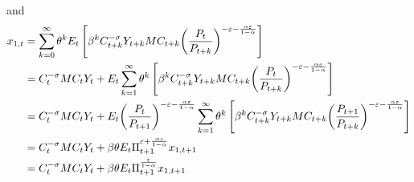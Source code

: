 \documentclass[12pt,a4paper]{article}
\begin{document}
and
\begin{align}
  {x_{1,t}} &= \sum\limits_{k = 0}^\infty  {{\theta ^k}{E_t}\left[ {{\beta ^k}C_{t + k}^{ - \sigma }{Y_{t + k}}M{C_{t + k}}{{\left( {\frac{{{P_t}}}{{{P_{t + k}}}}} \right)}^{ - \varepsilon  - \frac{{\alpha \varepsilon }}{{1 - \alpha }}}}} \right]}  \hfill \\
   &= C_t^{ - \sigma }M{C_t}{Y_t} + {E_t}\sum\limits_{k = 1}^\infty  {{\theta ^k}\left[ {{\beta ^k}C_{t + k}^{ - \sigma }{Y_{t + k}}M{C_{t + k}}{{\left( {\frac{{{P_t}}}{{{P_{t + k}}}}} \right)}^{ - \varepsilon  - \frac{{\alpha \varepsilon }}{{1 - \alpha }}}}} \right]}  \hfill \\
   &= C_t^{ - \sigma }M{C_t}{Y_t} + {E_t}{\left( {\frac{{{P_t}}}{{{P_{t + 1}}}}} \right)^{ - \varepsilon  - \frac{{\alpha \varepsilon }}{{1 - \alpha }}}}\sum\limits_{k = 1}^\infty  {{\theta ^k}\left[ {{\beta ^k}C_{t + k}^{ - \sigma }{Y_{t + k}}M{C_{t + k}}{{\left( {\frac{{{P_{t + 1}}}}{{{P_{t + k}}}}} \right)}^{ - \varepsilon  - \frac{{\alpha \varepsilon }}{{1 - \alpha }}}}} \right]}  \hfill \\
   &= C_t^{ - \sigma }M{C_t}{Y_t} + \beta \theta {E_t}\Pi _{t + 1}^{\varepsilon  + \frac{{\alpha \varepsilon }}{{1 - \alpha }}}{x_{1,t + 1}} \hfill \\
   &= C_t^{ - \sigma }M{C_t}{Y_t} + \beta \theta {E_t}\Pi _{t + 1}^{\frac{\varepsilon }{{1 - \alpha }}}{x_{1,t + 1}}
\end{align}
\end{document}
